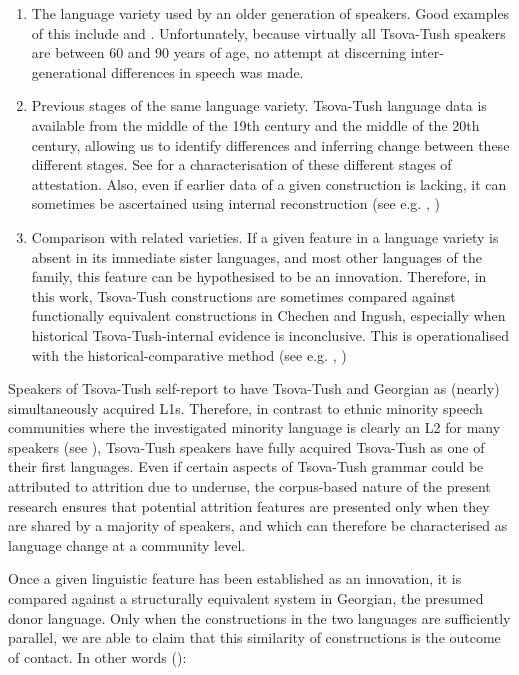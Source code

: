 \begin{enumerate}
	\item The language variety used by an older generation of speakers. Good examples of this include \textcite{otheguyetal2007contactspanish} and \textcite{saad2020phd}. Unfortunately, because virtually all Tsova-Tush speakers are between 60 and 90 years of age, no attempt at discerning inter-generational differences in speech was made.
	
	\item Previous stages of the same language variety. Tsova-Tush language data is available from the middle of the 19th century and the middle of the 20th century, allowing us to identify differences and inferring change between these different stages. See  for a characterisation of these different stages of attestation. Also, even if earlier data of a given construction is lacking, it can sometimes be ascertained using internal reconstruction (see e.g. \cite[234]{traskshistorical}, \cite[243]{josephjanda2003historical})
	
	\item Comparison with related varieties. If a given feature in a language variety is absent in its immediate sister languages, and most other languages of the family, this feature can be hypothesised to be an innovation. Therefore, in this work, Tsova-Tush constructions are sometimes compared against functionally equivalent constructions in Chechen and Ingush, especially when historical Tsova-Tush-internal evidence is inconclusive. This is operationalised with the historical-comparative method (see e.g. \cite[191]{traskshistorical}, \cite[199]{josephjanda2003historical})
\end{enumerate}

Speakers of Tsova-Tush self-report to have Tsova-Tush and Georgian as (nearly) simultaneously acquired L1s. Therefore, in contrast to ethnic minority speech communities where the investigated minority language is clearly an L2 for many speakers (see \cite[305]{poplack1997convergence}), Tsova-Tush speakers have fully acquired Tsova-Tush as one of their first languages. Even if certain aspects of Tsova-Tush grammar could be attributed to attrition due to underuse, the corpus-based nature of the present research ensures that potential attrition features are presented only when they are shared by a majority of speakers, and which can therefore be characterised as language change at a community level.

Once  a given linguistic feature has been established as an innovation, it is compared against a structurally equivalent system in Georgian, the presumed donor language. Only when the constructions in the two languages are sufficiently parallel, we are able to claim that this similarity of constructions is the outcome of contact. In other words (\cite[400--401]{poplacklevey2010contact}): 


